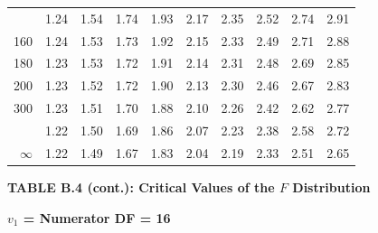 \documentclass[10pt]{article}
\begin{document}
\begin{longtable}{@{}r!{\vrule width 0.8pt\hspace{0.55em}}rrrrrrrrr@{}}
 & 1.24 & 1.54 & 1.74 & 1.93 & 2.17 & 2.35 & 2.52 & 2.74 & 2.91 \\
160 & 1.24 & 1.53 & 1.73 & 1.92 & 2.15 & 2.33 & 2.49 & 2.71 & 2.88 \\
180 & 1.23 & 1.53 & 1.72 & 1.91 & 2.14 & 2.31 & 2.48 & 2.69 & 2.85 \\
200 & 1.23 & 1.52 & 1.72 & 1.90 & 2.13 & 2.30 & 2.46 & 2.67 & 2.83 \\
300 & 1.23 & 1.51 & 1.70 & 1.88 & 2.10 & 2.26 & 2.42 & 2.62 & 2.77 \\
 & 1.22 & 1.50 & 1.69 & 1.86 & 2.07 & 2.23 & 2.38 & 2.58 & 2.72 \\
$\infty$ & 1.22 & 1.49 & 1.67 & 1.83 & 2.04 & 2.19 & 2.33 & 2.51 & 2.65 \\
\end{longtable}
\newpage
\thispagestyle{empty}
\begin{center}
{\large\bfseries TABLE B.4 (cont.): Critical Values of the $F$ Distribution\par}
\end{center}
{\large\bfseries $v_1$ = Numerator DF = 16\par}
\vspace{0.5em}
\small
\end{document}
